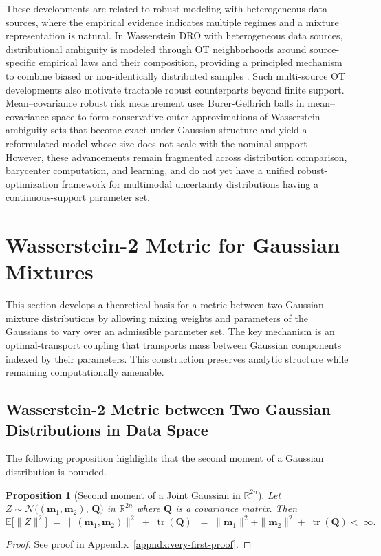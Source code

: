 \documentclass[opre,sglanonrev]{informs4}
\newtheorem{proposition}{Proposition}
\newcommand{\mN}{\mathcal{N}}
\newcommand{\mbR}{\mathbb R}
\newcommand{\bmean}{\bm{m}}
\newcommand{\bQ}{\bm Q}
\newcommand{\Tr}{\operatorname{tr}}
\begin{document}
These developments are related to robust modeling with heterogeneous data sources, where the empirical evidence indicates multiple regimes and a mixture representation is natural. In Wasserstein DRO with heterogeneous data sources, distributional ambiguity is modeled through OT neighborhoods around source-specific empirical laws and their composition, providing a principled mechanism to combine biased or non-identically distributed samples \cite{rychener2024heterogeneous}. Such multi-source OT developments also motivate tractable robust counterparts beyond finite support. Mean--covariance robust risk measurement uses Burer-Gelbrich balls in mean--covariance space to form conservative outer approximations of Wasserstein ambiguity sets that become exact under Gaussian structure and yield a reformulated model whose size does not scale with the nominal support \cite{nguyen2025meancov}. However, these advancements remain fragmented across distribution comparison, barycenter computation, and learning, and do not yet have a unified robust-optimization framework for multimodal uncertainty distributions having a continuous-support parameter set.



\section{Wasserstein-2 Metric for Gaussian Mixtures}\label{sec: continuous-param-GMM}
This section develops a theoretical basis for a metric between two Gaussian mixture distributions by allowing mixing weights and parameters of the Gaussians to vary over an admissible parameter set. The key mechanism is an optimal-transport coupling that transports mass between Gaussian components indexed by their parameters. This construction preserves analytic structure while remaining computationally amenable.

\subsection{Wasserstein-2 Metric between Two Gaussian Distributions in Data Space}
\label{sec:pre}

The following proposition highlights that the second moment of a Gaussian distribution is bounded. 

\begin{proposition}[Second moment of a Joint Gaussian in $\mbR^{2n}$]\label{prop: joint-gaussian-second-moment}
Let $Z \sim \mN\bigl((\bmean_1, \bmean_2),\,\bQ\bigr)$ in $\mbR^{2n}$ where $\bQ$ is a covariance matrix.
Then
\begin{equation}\label{eq: joint-gaussian-second-moment}
\mathbb E\bigl[\|Z\|^2\bigr]
\;=\;
\|(\bmean_1,\bmean_2)\|^2 \;+\; \Tr(\bQ)
\; \;=\; \|\bmean_1\|^2+\|\bmean_2\|^2 +\; \Tr(\bQ) <\;\infty.
\end{equation}
\end{proposition}
\begin{proof}
    See proof in Appendix~\ref{appndx:very-first-proof}.
\end{proof}
\end{document}

